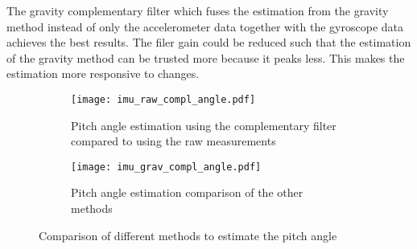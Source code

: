 The gravity complementary filter which fuses the estimation from the gravity method instead of only the accelerometer data together with the gyroscope data achieves the best results.
The filer gain could be reduced such that the estimation of the gravity method can be trusted more because it peaks less.
This makes the estimation more responsive to changes.
\begin{figure}[htb]
	\centering
	\begin{subfigure}{1\textwidth}
		\centering
		\texttt{[image: imu\_raw\_compl\_angle.pdf]}
		\caption{Pitch angle estimation using the complementary filter compared to using the raw measurements}
		\label{fig:imu_raw_compl_angle}
	\end{subfigure}
	
	\begin{subfigure}{1\textwidth}
		\centering
		\texttt{[image: imu\_grav\_compl\_angle.pdf]}
		\caption{Pitch angle estimation comparison of the other methods}
		\label{fig:imu_grav_compl_angle}
	\end{subfigure}
	\caption{Comparison of different methods to estimate the pitch angle}
\end{figure}
